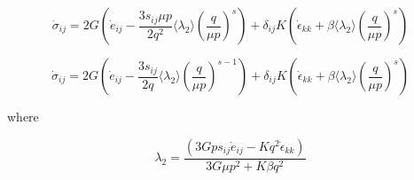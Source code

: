 \documentclass[a4paper]{article}
\begin{document}
\begin{equation}
\dot\sigma_{ij} = 2G\left(\dot e_{ij} - \frac{3s_{ij}\mu p}{2q^2}\langle\lambda_2\rangle
(\frac{q}{\mu p})^s\right) + \delta_{ij}K\left(\dot\epsilon_{kk} + \beta\langle\lambda_2\rangle(\frac{q}{\mu p})^s\right)
\end{equation}

\begin{equation}
\dot\sigma_{ij} = 2G\left(\dot e_{ij} - \frac{3s_{ij}}{2q}\langle\lambda_2\rangle
(\frac{q}{\mu p})^{s-1}\right) + \delta_{ij}K\left(\dot\epsilon_{kk} + \beta\langle\lambda_2\rangle(\frac{q}{\mu p})^s\right)
\end{equation}

where

\begin{equation}
\lambda_2=\frac{(3Gps_{ij}\dot e_{ij} - Kq^2\dot\epsilon_{kk})}
{3G\mu p^2 + K\beta q^2}
\end{equation}
\end{document}
